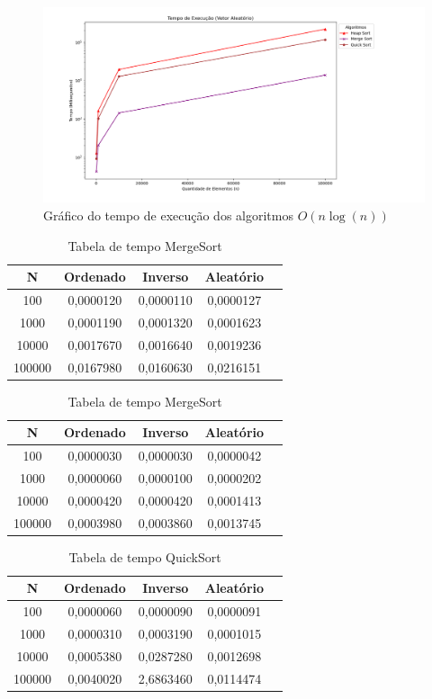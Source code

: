 \documentclass[10pt]{article}
\begin{document}
\begin{figure}[H]
  \centering
  \includegraphics[width=1.1\textwidth]{TempoExecnlogn.png}
  \caption{Gráfico do tempo de execução dos algoritmos $O(n \log(n))$}
  \label{fig:2}
\end{figure}

\begin{table}[H]
  \parbox{.45\linewidth}{
    \centering
    \caption{Tabela de tempo HeapSort}
    \begin{tabular}{|c|c|c|c|c|}
    \hline
    N & Ordenado & Inverso & Aleatório \\ \hline
    100 & 0,0000120 & 0,0000110 & 0,0000127 \\ \hline
    1000 & 0,0001190 & 0,0001320 & 0,0001623 \\ \hline
    10000 & 0,0017670 & 0,0016640 & 0,0019236 \\ \hline
    100000 & 0,0167980 & 0,0160630 & 0,0216151 \\ \hline
    \end{tabular}
  }
  \hfill
  \parbox{.45\linewidth}{
    \centering
    \caption{Tabela de tempo MergeSort}
    \begin{tabular}{|c|c|c|c|c|}
    \hline
    N & Ordenado & Inverso & Aleatório \\ \hline
    100 & 0,0000030 & 0,0000030 & 0,0000042 \\ \hline
    1000 & 0,0000060 & 0,0000100 & 0,0000202 \\ \hline
    10000 & 0,0000420 & 0,0000420 & 0,0001413 \\ \hline
    100000 & 0,0003980 & 0,0003860 & 0,0013745 \\ \hline
    \end{tabular}
  }
\end{table}

\begin{table}[H]
  \centering
  \caption{Tabela de tempo QuickSort}
  \begin{tabular}{|c|c|c|c|c|}
  \hline
  N & Ordenado & Inverso & Aleatório \\ \hline
  100 & 0,0000060 & 0,0000090 & 0,0000091 \\ \hline
  1000 & 0,0000310 & 0,0003190 & 0,0001015 \\ \hline
  10000 & 0,0005380 & 0,0287280 & 0,0012698 \\ \hline
  100000 & 0,0040020 & 2,6863460 & 0,0114474 \\ \hline
  \end{tabular}
\end{table}
\end{document}
